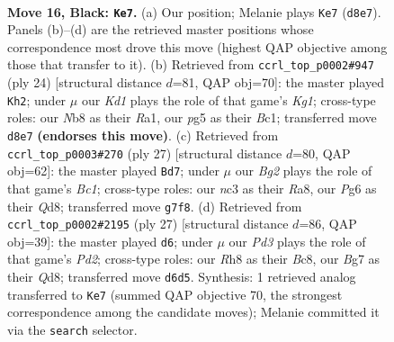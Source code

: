 \documentclass[11pt]{article}
\begin{document}
\begin{figure}[p]\centering
\begin{subfigure}{0.46\textwidth}\centering
\resizebox{\linewidth}{!}{%
\newchessgame
\chessboard[
  setfen={rn1k3r/ppqb2bp/3pp1p1/1B2p1Pn/4P3/2N1B3/PPP2PQP/2KRR3 b - - 1 16},
  showmover=false,
  pgfstyle=straightmove, color=movearrow, markmove={d8-e7}
]}
\caption{}
\end{subfigure}\hfill
\begin{subfigure}{0.46\textwidth}\centering
\resizebox{\linewidth}{!}{%
\newchessgame
\chessboard[
  setfen={2kr1b1r/ppq2p2/2n1bp2/2p1p2p/5P1N/3P2PP/PPP3B1/R1BQ1RK1 w - - 1 13},
  showmover=false,
  pgfstyle=straightmove, color=movearrow, markmove={g1-h2}
]}
\caption{}
\end{subfigure}
\\[4pt]
\begin{subfigure}{0.46\textwidth}\centering
\resizebox{\linewidth}{!}{%
\newchessgame
\chessboard[
  setfen={r1bq1rk1/5pb1/2pp1np1/pp5p/P2BP3/1BN2P2/1PPQ2PP/1K1R3R b - - 0 14},
  showmover=false,
  pgfstyle=straightmove, color=movearrow, markmove={c8-d7}
]}
\caption{}
\end{subfigure}\hfill
\begin{subfigure}{0.46\textwidth}\centering
\resizebox{\linewidth}{!}{%
\newchessgame
\chessboard[
  setfen={r1bqr1k1/p1ppbp1p/2p3pB/2n1P3/5P2/2NB3Q/PPP3PP/R4RK1 b - - 2 14},
  showmover=false,
  pgfstyle=straightmove, color=movearrow, markmove={d7-d6}
]}
\caption{}
\end{subfigure}
\caption{\textbf{Move 16, Black: \texttt{Ke7}.} (a) Our position; Melanie plays \texttt{Ke7} (\texttt{d8e7}). Panels (b)--(d) are the retrieved master positions whose correspondence most drove this move (highest QAP objective among those that transfer to it). (b) Retrieved from \texttt{ccrl\_top\_p0002\#947} (ply 24) [structural distance $d$=81, QAP obj=70]: the master played \texttt{Kh2}; under $\mu$ our \emph{Kd1} plays the role of that game's \emph{Kg1}; cross-type roles: our \emph{N}b8 as their \emph{R}a1, our \emph{p}g5 as their \emph{B}c1; transferred move \texttt{d8e7} \textbf{(endorses this move)}. (c) Retrieved from \texttt{ccrl\_top\_p0003\#270} (ply 27) [structural distance $d$=80, QAP obj=62]: the master played \texttt{Bd7}; under $\mu$ our \emph{Bg2} plays the role of that game's \emph{Bc1}; cross-type roles: our \emph{n}c3 as their \emph{R}a8, our \emph{P}g6 as their \emph{Q}d8; transferred move \texttt{g7f8}. (d) Retrieved from \texttt{ccrl\_top\_p0002\#2195} (ply 27) [structural distance $d$=86, QAP obj=39]: the master played \texttt{d6}; under $\mu$ our \emph{Pd3} plays the role of that game's \emph{Pd2}; cross-type roles: our \emph{R}h8 as their \emph{B}c8, our \emph{B}g7 as their \emph{Q}d8; transferred move \texttt{d6d5}. Synthesis: 1 retrieved analog transferred to \texttt{Ke7} (summed QAP objective 70, the strongest correspondence among the candidate moves); Melanie committed it via the \texttt{search} selector.}
\label{fig:thought-m31}
\end{figure}
\end{document}
